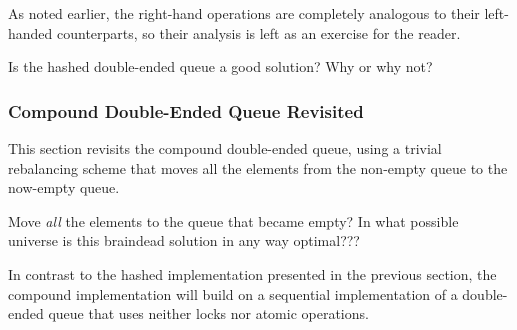 As noted earlier, the right-hand operations are completely analogous
to their left-handed counterparts, so their analysis is left as an
exercise for the reader.

\QuickQuiz{}
	Is the hashed double-ended queue a good solution?
	Why or why not?
 \QuickQuizEnd

\subsubsection{Compound Double-Ended Queue Revisited}
\label{sec:SMPdesign:Compound Double-Ended Queue Revisited}

This section revisits the compound double-ended queue, using a trivial
rebalancing scheme that moves all the elements from the non-empty
queue to the now-empty queue.

\QuickQuiz{}
	Move \emph{all} the elements to the queue that became empty?
	In what possible universe is this braindead solution in any
	way optimal???
 \QuickQuizEnd

In contrast to the hashed implementation presented in
the previous section, the compound implementation will build on
a sequential implementation of a double-ended queue that uses
neither locks nor atomic operations.

